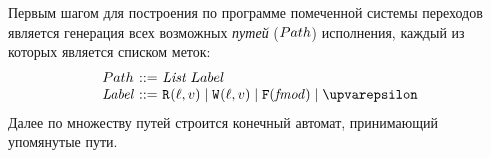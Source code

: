 

Первым шагом для построения по программе помеченной системы переходов является
генерация всех возможных \emph{путей} ($Path$) исполнения, каждый из которых является списком меток:
\[\begin{array}{l @{~} r @{~} l}
    \Path  & ::= & \ListOf{Label} \\
    \Label & ::= & \rlab{}{\loc}{\val} \mid \wlab{}{\loc}{\val}
           \mid \flab{\FtypeProm} \mid \epsilon \\
\end{array}\]
Далее по множеству путей строится конечный автомат, принимающий упомянутые пути.

